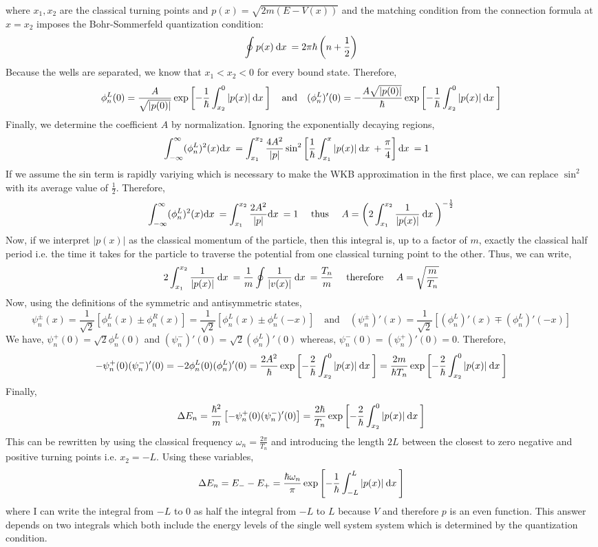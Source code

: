 \documentclass[12pt]{extarticle}
\newcommand{\pL}{\phi^L_n}
\newcommand{\pR}{\phi^R_n}
\newcommand{\pspm}{\psi_{n}^{\pm}}
\newcommand{\psp}{\psi_{n}^{+}}
\newcommand{\psm}{\psi_{n}^{-}}
\newcommand{\dpsp}{(\psi_{n}^{+})'}
\newcommand{\dpsm}{(\psi_{n}^{-})'}
\begin{document}
where $x_1, x_2$ are the classical turning points and $p(x) = \sqrt{2m (E - V(x))}$ and the matching condition from the connection formula at $x = x_2$ imposes the Bohr-Sommerfeld quantization condition: 
\[ \oint p(x) \: \mathrm{d}x \: = 2 \pi \hbar \left(n + \frac{1}{2} \right) \]
Because the wells are separated, we know that $x_1 < x_2 < 0$ for every bound state. Therefore, 
\[ \pL(0) = \frac{A}{\sqrt{|p(0)|}} \exp \left[ - \frac{1}{\hbar} \int_{x_2}^{0} |p(x)| \: \d{x} \right] \quad \text{and} \quad (\pL)'(0) = - \frac{A \sqrt{|p(0)|}}{\hbar} \exp \left[ - \frac{1}{\hbar} \int_{x_2}^{0} |p(x)| \: \d{x} \right]\]
Finally, we determine the coefficient $A$ by normalization. Ignoring the exponentially decaying regions,  
\begin{align*}
\int_{-\infty}^{\infty} (\pL)^2(x) \d{x} & = \int_{x_1}^{x_2} \frac{4 A^2}{|p|} \sin^2 \left[ \frac{1}{\hbar} \int_{x_1}^{x} |p(x)| \: \d{x} + \frac{\pi}{4} \right] \d{x} = 1
\end{align*}
If we assume the sin term is rapidly variying which is necessary to make the WKB approximation in the first place, we can replace $\sin^2$ with its average value of $\frac{1}{2}$. Therefore, 
\[
\int_{-\infty}^{\infty} (\pL)^2(x) \d{x} = \int_{x_1}^{x_2} \frac{2 A^2}{|p|} \d{x} = 1 \quad \text{ thus } \quad A = \left( 2 \int_{x_1}^{x_2} \frac{1}{|p(x)|} \: \d{x} \right)^{-\frac{1}{2}} \]
Now, if we interpret $|p(x)|$ as the classical momentum of the particle, then this integral is, up to a factor of $m$, exactly the classical half period i.e. the time it takes for the particle to traverse the potential from one classical turning point to the  other. Thus, we can write,
\[ 2 \int_{x_1}^{x_2} \frac{1}{|p(x)|} \: \mathrm{d}x \: = \frac{1}{m} \oint \frac{1}{|v(x)|} \: \mathrm{d}x \: = \frac{T_n}{m} \quad \text{ therefore } \quad A = \sqrt{\frac{m}{T_n}}\]
Now, using the definitions of the symmetric and antisymmetric states,
\[ \pspm(x) = \frac{1}{\sqrt{2}} \left[ \pL(x) \pm \pR(x) \right] = \frac{1}{\sqrt{2}} \left[ \pL(x) \pm \pL(-x) \right] \quad \text{and} \quad (\pspm)'(x) = \frac{1}{\sqrt{2}} \left[ (\pL)'(x) \mp (\pL)'(-x) \right] \]
We have, $\psp(0) = \sqrt{2} \pL(0)$ and $\dpsm(0) = \sqrt{2} (\pL)'(0)$ whereas, $\psm(0) = \dpsp(0) = 0$. Therefore,
\[- \psp(0) \dpsm(0) = - 2 \pL(0) (\pL)'(0) = \frac{2A^2}{\hbar} \exp \left[ - \frac{2}{\hbar} \int_{x_2}^{0} |p(x)| \: \d{x} \right] = \frac{2m}{\hbar T_n} \exp \left[ - \frac{2}{\hbar} \int_{x_2}^{0} |p(x)| \: \d{x} \right]\]
Finally,
\[\Delta E_n = \frac{\hbar^2}{m} \left[- \psp(0) \dpsm(0) \right] = \frac{2\hbar}{T_n} \exp \left[ - \frac{2}{\hbar} \int_{x_2}^{0} |p(x)| \: \d{x} \right]\] 
This can be rewritten by using the classical frequency $\omega_n = \frac{2\pi}{T_n}$ and introducing the length $2L$ between the closest to zero negative and positive turning points i.e. $x_2 = -L$. Using these variables,
\[\Delta E_n = E_{-} - E_{+} =  \frac{\hbar \omega_n}{\pi} \exp \left[ - \frac{1}{\hbar} \int_{-L}^{L} |p(x)| \: \mathrm{d}x \: \right]\] 
where I can write the integral from $-L$ to $0$ as half the integral from $-L$ to $L$ because $V$ and therefore $p$ is an even function. This answer depends on two integrals which both include the energy levels of the single well system system which is determined by the quantization condition. 
\end{document}
